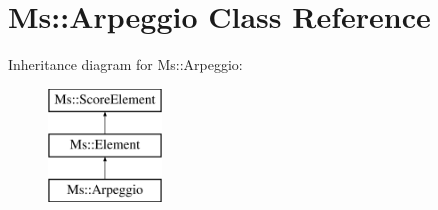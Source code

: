 \hypertarget{class_ms_1_1_arpeggio}{}\section{Ms\+:\+:Arpeggio Class Reference}
\label{class_ms_1_1_arpeggio}
Inheritance diagram for Ms\+:\+:Arpeggio\+:\begin{figure}[H]
\begin{center}
\leavevmode
\includegraphics[height=3.000000cm]{class_ms_1_1_arpeggio}
\end{center}
\end{figure}
